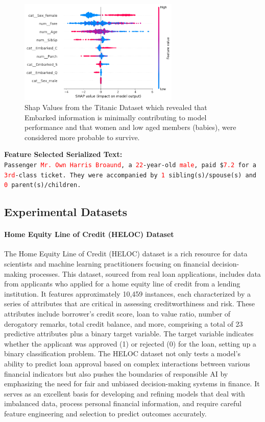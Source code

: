 \documentclass{article}
\theoremstyle{plain}
\theoremstyle{definition}
\theoremstyle{remark}
\begin{document}
\begin{figure}[h!]
    \centering
    \includegraphics[width=3in]{shap.png}
    \caption{Shap Values from the Titanic Dataset which revealed that Embarked information is minimally contributing to model performance and that women and low aged members (babies), were considered more probable to survive.}
    \label{shap}
\end{figure}

\newpage
\begin{mdframed}
\textbf{Feature Selected Serialized Text:}\\
\texttt{Passenger \textcolor{red}{Mr. Own Harris Broaund}, a \textcolor{red}{22}-year-old \textcolor{red}{male}, paid \$\textcolor{red}{7.2} for a \textcolor{red}{3rd}-class ticket. They were accompanied by \textcolor{red}{1} sibling(s)/spouse(s) and \textcolor{red}{0} parent(s)/children.
}
\end{mdframed}

\subsection{Experimental Datasets}

\paragraph{Home Equity Line of Credit (HELOC) Dataset} The Home Equity Line of Credit (HELOC) dataset is a rich resource for data scientists and machine learning practitioners focusing on financial decision-making processes. This dataset, sourced from real loan applications, includes data from applicants who applied for a home equity line of credit from a lending institution. It features approximately 10,459 instances, each characterized by a series of attributes that are critical in assessing creditworthiness and risk. These attributes include borrower’s credit score, loan to value ratio, number of derogatory remarks, total credit balance, and more, comprising a total of 23 predictive attributes plus a binary target variable. The target variable indicates whether the applicant was approved (1) or rejected (0) for the loan, setting up a binary classification problem. The HELOC dataset not only tests a model's ability to predict loan approval based on complex interactions between various financial indicators but also pushes the boundaries of responsible AI by emphasizing the need for fair and unbiased decision-making systems in finance. It serves as an excellent basis for developing and refining models that deal with imbalanced data, process personal financial information, and require careful feature engineering and selection to predict outcomes accurately.
\end{document}
